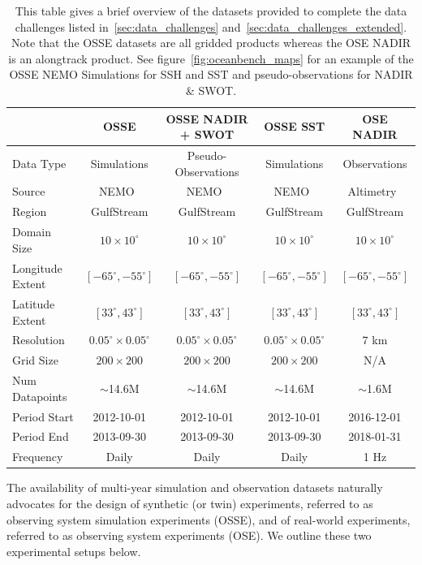 \begin{table}[ht]
\caption{This table gives a brief overview of the datasets provided to complete the data challenges listed in~\ref{sec:data_challenges} and~\ref{sec:data_challenges_extended}. Note that the OSSE datasets are all gridded products whereas the OSE NADIR is an alongtrack product. See figure~\ref{fig:oceanbench_maps} for an example of the OSSE NEMO Simulations for SSH and SST and pseudo-observations for NADIR \& SWOT.}
\label{tb:datasets}
\centering
\begin{tabular}{lcccc}
 \toprule
 & OSSE & OSSE NADIR + SWOT & OSSE SST & OSE NADIR  \\ \midrule
 Data Type & Simulations & 
Pseudo-Observations & 
 Simulations & Observations \\
Source     & 
NEMO~\citep{NEMOAJAYI2020} & 
NEMO~\citep{NEMOAJAYI2020} &
NEMO~\citep{NEMOAJAYI2020}
& Altimetry~\citep{MDSALONGTRACK} \\
Region & 
GulfStream & GulfStream & GulfStream & GulfStream \\
Domain Size &
$10\times 10^\circ$ &
$10\times 10^\circ$ &
$10\times 10^\circ$ &
$10\times 10^\circ$
\\
Longitude Extent &
$[-65^\circ, -55^\circ]$ & 
$[-65^\circ, -55^\circ]$ &
$[-65^\circ, -55^\circ]$ &
$[-65^\circ, -55^\circ]$ \\
Latitude Extent &
$[33^\circ, 43^\circ]$ &
$[33^\circ, 43^\circ]$ &
$[33^\circ, 43^\circ]$ &
$[33^\circ, 43^\circ]$ \\
Resolution &
$0.05^\circ\times 0.05^\circ$ &
$0.05^\circ\times 0.05^\circ$ &
$0.05^\circ\times 0.05^\circ$ &
$7$ km \\
Grid Size &
$200\times 200$ & $200\times 200$ & $200\times 200$ & N/A \\
Num Datapoints &
$\sim$14.6M & $\sim$14.6M & $\sim$14.6M & $\sim$1.6M \\
Period Start & 2012-10-01 & 2012-10-01 & 2012-10-01 & 2016-12-01 \\
Period End & 2013-09-30 & 2013-09-30 & 2013-09-30 & 2018-01-31 \\
Frequency  & Daily & Daily & Daily & 1 Hz \\
\bottomrule
\end{tabular}
\end{table}

The availability of multi-year simulation and observation datasets naturally advocates for the design of synthetic (or twin) experiments, referred to as observing system simulation experiments (OSSE), and of real-world experiments, referred to as observing system experiments (OSE).
We outline these two experimental setups below.

